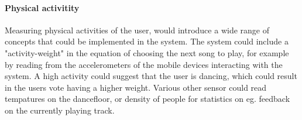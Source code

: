 \paragraph{Physical activitity}
Measuring physical activities of the user, would introduce a wide range of concepts that could be implemented in the system. The system could include a "activity-weight" in the equation of choosing the next song to play, for example by reading from the accelerometers of the mobile devices interacting with the system. A high activity could suggest that the user is dancing, which could result in the users vote having a higher weight. Various other sensor could read tempatures on the dancefloor, or density of people for statistics on eg. feedback on the currently playing track.